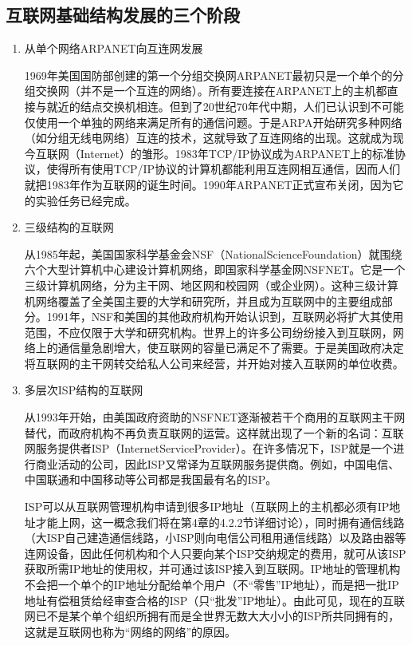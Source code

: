 \subsection{互联网基础结构发展的三个阶段}
\begin{enumerate}
    \item 从单个网络ARPANET向互连网发展
    
    1969年美国国防部创建的第一个分组交换网ARPANET最初只是一个单个的分组交换网（并不是一个互连的网络）。所有要连接在ARPANET上的主机都直接与就近的结点交换机相连。但到了20世纪70年代中期，人们已认识到不可能仅使用一个单独的网络来满足所有的通信问题。于是ARPA开始研究多种网络（如分组无线电网络）互连的技术，这就导致了互连网络的出现。这就成为现今互联网（Internet）的雏形。1983年TCP/IP协议成为ARPANET上的标准协议，使得所有使用TCP/IP协议的计算机都能利用互连网相互通信，因而人们就把1983年作为互联网的诞生时间。1990年ARPANET正式宣布关闭，因为它的实验任务已经完成。
    \item 三级结构的互联网
    
    从1985年起，美国国家科学基金会NSF（NationalScienceFoundation）就围绕六个大型计算机中心建设计算机网络，即国家科学基金网NSFNET。它是一个三级计算机网络，分为主干网、地区网和校园网（或企业网）。这种三级计算机网络覆盖了全美国主要的大学和研究所，并且成为互联网中的主要组成部分。1991年，NSF和美国的其他政府机构开始认识到，互联网必将扩大其使用范围，不应仅限于大学和研究机构。世界上的许多公司纷纷接入到互联网，网络上的通信量急剧增大，使互联网的容量已满足不了需要。于是美国政府决定将互联网的主干网转交给私人公司来经营，并开始对接入互联网的单位收费。
    \item 多层次ISP结构的互联网
    
    从1993年开始，由美国政府资助的NSFNET逐渐被若干个商用的互联网主干网替代，而政府机构不再负责互联网的运营。这样就出现了一个新的名词：互联网服务提供者ISP（InternetServiceProvider）。在许多情况下，ISP就是一个进行商业活动的公司，因此ISP又常译为互联网服务提供商。例如，中国电信、中国联通和中国移动等公司都是我国最有名的ISP。

    ISP可以从互联网管理机构申请到很多IP地址（互联网上的主机都必须有IP地址才能上网，这一概念我们将在第4章的4.2.2节详细讨论），同时拥有通信线路（大ISP自己建造通信线路，小ISP则向电信公司租用通信线路）以及路由器等连网设备，因此任何机构和个人只要向某个ISP交纳规定的费用，就可从该ISP获取所需IP地址的使用权，并可通过该ISP接入到互联网。IP地址的管理机构不会把一个单个的IP地址分配给单个用户（不“零售”IP地址），而是把一批IP地址有偿租赁给经审查合格的ISP（只“批发”IP地址）。由此可见，现在的互联网已不是某个单个组织所拥有而是全世界无数大大小小的ISP所共同拥有的，这就是互联网也称为“网络的网络”的原因。
\end{enumerate}

